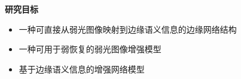 \documentclass[CJK,aspectratio=169]{beamer}  %
\begin{document}
	\begin{frame}
		{ \yahei \textbf{研究目标}}
		
		\begin{itemize}
			\item [\checkmark]
			一种可直接从弱光图像映射到边缘语义信息的边缘网络结构
			
			\vspace{0.5cm}
			
			\item [\checkmark]
			一种可用于弱恢复的弱光图像增强模型
	
			\vspace{0.5cm}
			
			\item [\checkmark]
			基于边缘语义信息的增强网络模型
		\end{itemize}
		
	\end{frame}
	
\end{document}
